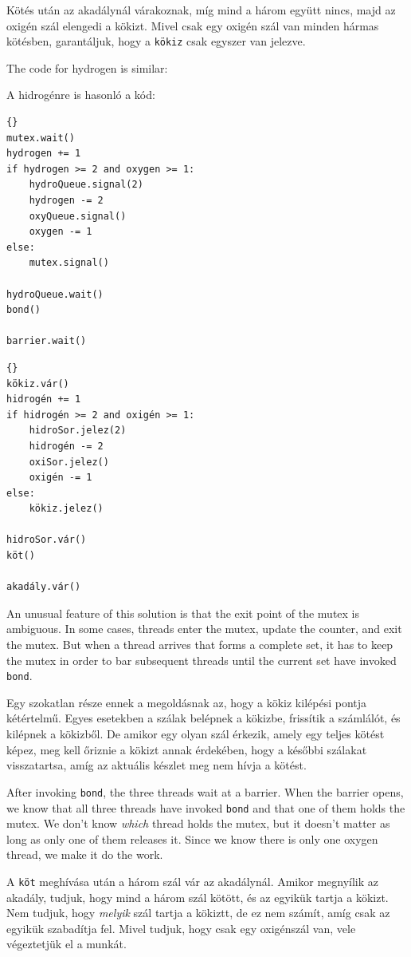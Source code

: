\documentclass{book}
\begin{document}
Kötés után az akadálynál várakoznak, míg mind a három együtt nincs,
majd az oxigén szál elengedi a kökizt. Mivel csak egy oxigén
szál van minden hármas kötésben, garantáljuk, hogy a {\tt kökiz} csak
egyszer van jelezve.

The code for hydrogen is similar:

A hidrogénre is hasonló a kód:

\begin{lstlisting}[title={Hydrogen code}]{}
mutex.wait()
hydrogen += 1
if hydrogen >= 2 and oxygen >= 1:
    hydroQueue.signal(2)
    hydrogen -= 2
    oxyQueue.signal()
    oxygen -= 1
else:
    mutex.signal()

hydroQueue.wait()
bond()

barrier.wait()
\end{lstlisting}

\begin{lstlisting}[title={Hidrogén kód}]{}
kökiz.vár()
hidrogén += 1
if hidrogén >= 2 and oxigén >= 1:
    hidroSor.jelez(2)
    hidrogén -= 2
    oxiSor.jelez()
    oxigén -= 1
else:
    kökiz.jelez()

hidroSor.vár()
köt()

akadály.vár()
\end{lstlisting}

An unusual feature of this solution is that
the exit point of the mutex is ambiguous.  In
some cases, threads enter the mutex, update the counter, and exit the
mutex.  But when a thread arrives that forms a complete set, it has to
keep the mutex in order to bar subsequent threads until the current
set have invoked {\tt bond}.

Egy szokatlan része ennek a megoldásnak az, hogy a kökiz kilépési
pontja kétértelmű. Egyes esetekben a szálak belépnek a kökizbe,
frissítik a számlálót, és kilépnek a kökizből. De amikor egy olyan szál
érkezik, amely egy teljes kötést képez, meg kell őriznie a kökizt
annak érdekében, hogy a későbbi szálakat visszatartsa, amíg az aktuális
készlet meg nem hívja a kötést.

After invoking {\tt bond}, the three threads wait at a barrier.
When the barrier opens, we know that all three threads have invoked
{\tt bond} and that one of them holds the mutex.  We don't know
{\em which} thread holds the mutex, but it doesn't matter as long
as only one of them releases it.  Since we know there is only one
oxygen thread, we make it do the work.

A {\tt köt} meghívása után a három szál vár az akadálynál. Amikor megnyílik
az akadály, tudjuk, hogy mind a három szál kötött, és az egyikük
tartja a kökizt. Nem tudjuk, hogy {\em melyik} szál tartja a kökiztt, de ez nem számít,
amíg csak az egyikük szabadítja fel. Mivel tudjuk, hogy csak egy
oxigénszál van, vele végeztetjük el a munkát.
\end{document}
